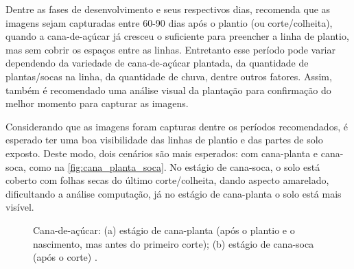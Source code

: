 \documentclass[12pt, a4paper, english, brazil]{article}
\begin{document}
Dentre as fases de desenvolvimento e seus respectivos dias,  recomenda que as imagens sejam capturadas entre 60-90 dias após o plantio (ou corte/colheita), quando a cana-de-açúcar já cresceu o suficiente para preencher a linha de plantio, mas sem cobrir os espaços entre as linhas. Entretanto esse período pode variar dependendo da variedade de cana-de-açúcar plantada, da quantidade de plantas/socas na linha, da quantidade de chuva, dentre outros fatores. Assim, também é recomendado uma análise visual da plantação para confirmação do melhor momento para capturar as imagens.

Considerando que as imagens foram capturas dentre os períodos recomendados, é esperado ter uma boa visibilidade das linhas de plantio e das partes de solo exposto. Deste modo, dois cenários são mais esperados: com cana-planta e cana-soca, como na \autoref{fig:cana_planta_soca}. No estágio de cana-soca, o solo está coberto com folhas secas do último corte/colheita, dando aspecto amarelado, dificultando a análise computação, já no estágio de cana-planta o solo está mais visível.

\begin{figure}[htbp]
    \centering
    \caption{Cana-de-açúcar: (a) estágio de cana-planta (após o plantio e o nascimento, mas antes do primeiro corte); (b) estágio de cana-soca (após o corte) \cite{Silva_2020}.}
    \label{fig:cana_planta_soca}
\end{figure}
\end{document}
